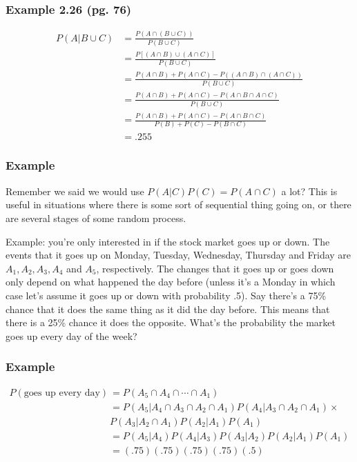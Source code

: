 \documentclass{beamer}
\begin{document}
\begin{frame}
\frametitle{Example 2.26 (pg. 76)}

\begin{align*}
P(A | B \cup C) &= \frac{P(A \cap (B \cup C))}{P(B \cup C)} \\
&= \frac{P[(A \cap B) \cup (A \cap C)]}{P(B \cup C)} \\
&= \frac{P(A \cap B) + P(A \cap C) - P((A \cap B) \cap (A \cap C)) }{P(B \cup C)} \\
&= \frac{P(A \cap B) + P(A \cap C) - P(A \cap B \cap A \cap C) }{P(B \cup C)} \\
&= \frac{P(A \cap B) + P(A \cap C) - P(A \cap B \cap C) }{P(B) + P(C) - P(B \cap C)} \\
&= .255
\end{align*}



\end{frame}



\begin{frame}
\frametitle{Example}

Remember we said we would use $P(A|C)P(C) = P(A \cap C)$ a lot? This is useful in situations where there is some sort of sequential thing going on, or there are several stages of some random process.
\newline

Example: you're only interested in if the stock market goes up or down. The events that it goes up on Monday, Tuesday, Wednesday, Thursday and Friday are $A_1, A_2, A_3, A_4$ and $A_5$, respectively. The changes that it goes up or goes down only depend on what happened the day before (unless it's a Monday in which case let's assume it goes up or down with probability .5). Say there's a 75\% chance that it does the same thing as it did the day before. This means that there is a 25\% chance it does the opposite. What's the probability the market goes up every day of the week?

\end{frame}



\begin{frame}
\frametitle{Example}

\begin{align*}
P(\text{goes up every day}) &= P(A_5 \cap A_4 \cap \cdots \cap A_1) \\
&= P(A_5 | A_4 \cap A_3 \cap A_2 \cap A_1)P(A_4 |A_3 \cap A_2 \cap A_1) \times \\
&      P(A_3 |  A_2 \cap A_1) P(A_2 | A_1) P(A_1) \\
&= P(A_5 | A_4)P(A_4 |A_3)P(A_3 |  A_2) P(A_2 | A_1) P(A_1) \\
&= (.75)(.75)(.75)(.75)(.5)
\end{align*}

\end{frame}
\end{document}
